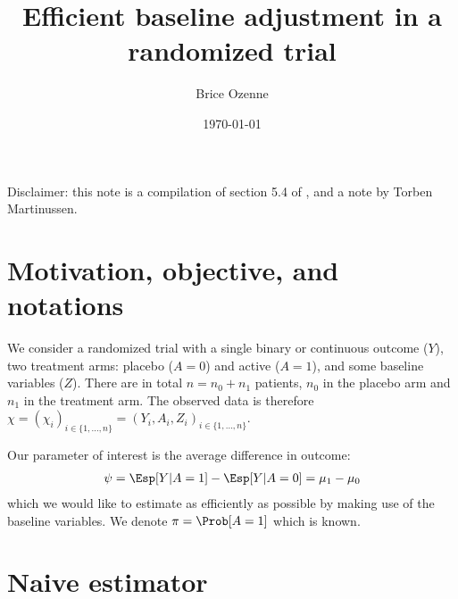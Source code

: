 \documentclass[12pt]{article}
\author{Brice Ozenne}
\date{\today}
\title{Efficient baseline adjustment in a randomized trial}
\newcommand\sample{\chi}
\begin{document}
\maketitle
Disclaimer: this note is a compilation of section 5.4 of
\cite{tsiatis2007semiparametric}, \cite{zhang2010increasing} and a note by
Torben Martinussen.

\section{Motivation, objective, and notations}
\label{sec:org4a44577}

We consider a randomized trial with a single binary or continuous
outcome (\(Y\)), two treatment arms: placebo (\(A=0\)) and active
(\(A=1\)), and some baseline variables (\(Z\)). There are in total
\(n=n_0+n_1\) patients, \(n_0\) in the placebo arm and \(n_1\) in the
treatment arm. The observed data is therefore \(\sample =
\left(\sample_i\right)_{i \in \{1,\ldots,n\}} =
\left(Y_i,A_i,Z_i\right)_{i \in \{1,\ldots,n\}}\).

\bigskip 

Our parameter of interest is the average difference in outcome:
\begin{align*}
\psi = \Esp[Y|A=1] - \Esp[Y|A=0] = \mu_1 - \mu_0
\end{align*}
which we would like to estimate as efficiently as possible by making
use of the baseline variables. We denote \(\pi=\Prob[A=1]\) which is
known.

\section{Naive estimator}
\label{sec:org305145a}
\end{document}
